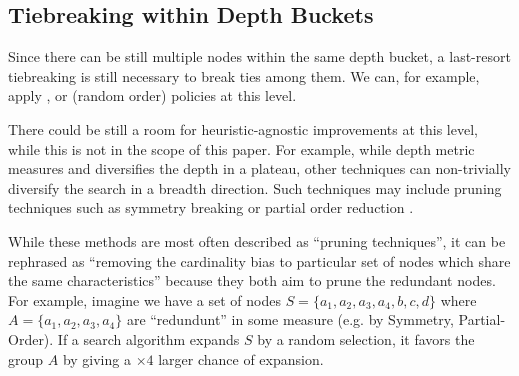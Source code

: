 \subsection{Tiebreaking within Depth Buckets}

Since there can be still multiple nodes within the same depth bucket, a
last-resort tiebreaking is still necessary to break ties among them.
We can, for example, apply \lifo, \fifo or \ro (random order) policies
at this level.

There could be still a room for heuristic-agnostic improvements at
this level, while this is not in the scope of this paper.
For example, while depth metric measures and diversifies the depth in a plateau,
other techniques can non-trivially diversify the search in a breadth direction.
Such techniques may include pruning techniques such as 
symmetry breaking \cite{Fox1998,pochter2011exploiting,domshlak2013symmetry}
or partial order reduction \cite{hall2013faster,wehrle2013relative}.

While these methods are most often described as ``pruning techniques'',
it can be rephrased as ``removing the cardinality bias to particular set
of nodes which share the same characteristics'' because they both aim to
prune the redundant nodes. For example, imagine we have a
set of nodes $S=\{a_1, a_2, a_3, a_4, b, c, d\}$ where
$A=\{a_1, a_2, a_3, a_4\}$ are ``redundunt'' in some measure (e.g. by Symmetry,
Partial-Order). 
If a search algorithm expands $S$ by a random selection, it favors the
group $A$ by giving a $\times 4$ larger chance of expansion.




